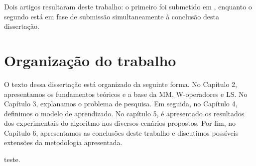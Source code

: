 Dois artigos resultaram deste trabalho: o primeiro foi submetido em \cite{DIEGO:USDMM}, enquanto o segundo está em fase de submissão simultaneamente à conclusão desta dissertação.

\section{Organização do trabalho}

O texto dessa dissertação está organizado da seguinte forma. No Capítulo 2, apresentamos os fundamentos teóricos e a base da MM, W-operadores e LS. No Capítulo 3, explanamos o problema de pesquisa. Em seguida, no Capítulo 4, definimos o modelo de aprendizado. No capítulo 5, é apresentado os resultados dos experimentais do algoritmo nos diversos cenários propostos. Por fim, no Capítulo 6, apresentamos as conclusões deste trabalho e discutimos possíveis extensões da metodologia apresentada.

teste.
